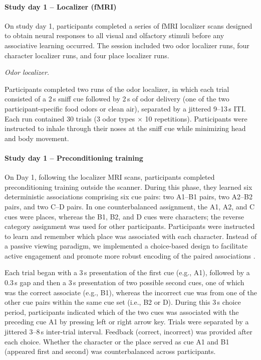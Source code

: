\documentclass[12pt,letterpaper]{article}
\begin{document}
\paragraph*{Study day 1 – Localizer (fMRI)}

On study day 1, participants completed a series of fMRI localizer scans designed to obtain neural responses to all visual and olfactory stimuli before any associative learning occurred. The session included two odor localizer runs, four character localizer runs, and four place localizer runs.

\textit{Odor localizer.}

Participants completed two runs of the odor localizer, in which each trial consisted of a 2\,s sniff cue followed by 2\,s of odor delivery (one of the two participant-specific food odors or clean air), separated by a jittered 9--13\,s ITI. Each run contained 30 trials (3 odor types $\times$ 10 repetitions). Participants were instructed to inhale through their noses at the sniff cue while minimizing head and body movement.

\paragraph*{Study day 1 – Preconditioning training}

On Day 1, following the localizer MRI scans, participants completed preconditioning training outside the scanner. During this phase, they learned six deterministic associations comprising six cue pairs: two A1–B1 pairs, two A2–B2 pairs, and two C–D pairs. In one counterbalanced assignment, the A1, A2, and C cues were places, whereas the B1, B2, and D cues were characters; the reverse category assignment was used for other participants. Participants were instructed to learn and remember which place was associated with each character. Instead of a passive viewing paradigm, we implemented a choice-based design to facilitate active engagement and promote more robust encoding of the paired associations \citep{bunsey1996conservation}.

Each trial began with a 3\,s presentation of the first cue (e.g., A1), followed by a 0.3\,s gap and then a 3\,s presentation of two possible second cues, one of which was the correct associate (e.g., B1), whereas the incorrect cue was from one of the other cue pairs within the same cue set (i.e., B2 or D). During this 3\,s choice period, participants indicated which of the two cues was associated with the preceding cue A1 by pressing left or right arrow key. Trials were separated by a jittered 3–8\,s inter-trial interval. Feedback (correct, incorrect) was provided after each choice. Whether the character or the place served as cue A1 and B1 (appeared first and second) was counterbalanced across participants.
\end{document}
